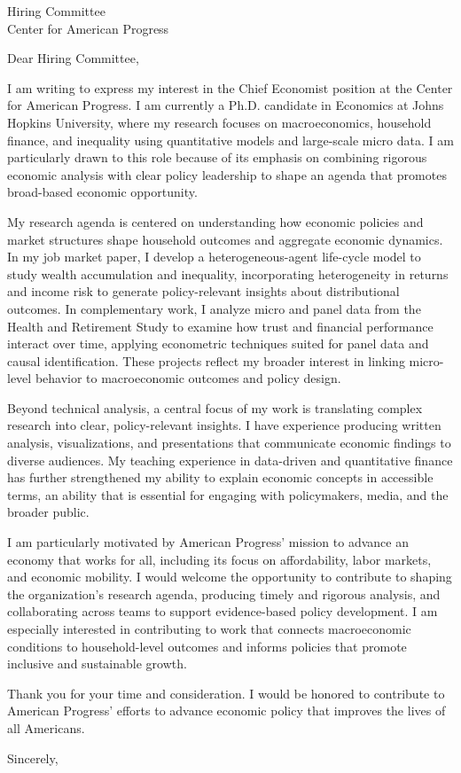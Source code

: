 \documentclass[11pt]{letter}
\begin{document}
\begin{letter}{Hiring Committee \\
Center for American Progress}

\opening{Dear Hiring Committee,}

I am writing to express my interest in the Chief Economist position at the Center for American Progress. I am currently a Ph.D. candidate in Economics at Johns Hopkins University, where my research focuses on macroeconomics, household finance, and inequality using quantitative models and large-scale micro data. I am particularly drawn to this role because of its emphasis on combining rigorous economic analysis with clear policy leadership to shape an agenda that promotes broad-based economic opportunity.

My research agenda is centered on understanding how economic policies and market structures shape household outcomes and aggregate economic dynamics. In my job market paper, I develop a heterogeneous-agent life-cycle model to study wealth accumulation and inequality, incorporating heterogeneity in returns and income risk to generate policy-relevant insights about distributional outcomes. In complementary work, I analyze micro and panel data from the Health and Retirement Study to examine how trust and financial performance interact over time, applying econometric techniques suited for panel data and causal identification. These projects reflect my broader interest in linking micro-level behavior to macroeconomic outcomes and policy design.

Beyond technical analysis, a central focus of my work is translating complex research into clear, policy-relevant insights. I have experience producing written analysis, visualizations, and presentations that communicate economic findings to diverse audiences. My teaching experience in data-driven and quantitative finance has further strengthened my ability to explain economic concepts in accessible terms, an ability that is essential for engaging with policymakers, media, and the broader public.

I am particularly motivated by American Progress’ mission to advance an economy that works for all, including its focus on affordability, labor markets, and economic mobility. I would welcome the opportunity to contribute to shaping the organization’s research agenda, producing timely and rigorous analysis, and collaborating across teams to support evidence-based policy development. I am especially interested in contributing to work that connects macroeconomic conditions to household-level outcomes and informs policies that promote inclusive and sustainable growth.

Thank you for your time and consideration. I would be honored to contribute to American Progress’ efforts to advance economic policy that improves the lives of all Americans.

\closing{Sincerely,}

\end{letter}
\end{document}
